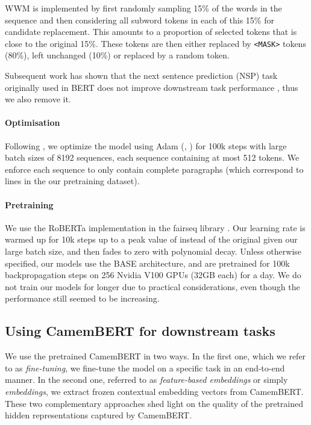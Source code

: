 \documentclass[11pt,a4paper]{article}
\newcommand{\camembert}{CamemBERT\xspace}
\newcommand{\roberta}{RoBERTa\xspace}
\newcommand{\bert}{BERT\xspace}
\begin{document}
WWM is implemented by first randomly sampling 15\% of the words in the sequence and then considering all subword tokens in each of this 15\% for candidate replacement. This amounts to a proportion of selected tokens that is close to the original 15\%.
These tokens are then either replaced by \texttt{<MASK>} tokens (80\%), left unchanged (10\%) or replaced by a random token.

Subsequent work has shown that the next sentence prediction (NSP) task originally used in \bert does not improve downstream task performance \cite{lample2019cross,liu2019roberta}, thus we also remove it.



\paragraph{Optimisation}
Following \citep{liu2019roberta}, we optimize the model using Adam \cite{kingma2014adam} (, ) for 100k steps with large batch sizes of 8192 sequences, each sequence containing at most 512 tokens.
We enforce each sequence to only contain complete paragraphs (which correspond to lines in the our pretraining dataset).

\paragraph{Pretraining}
We use the \roberta implementation in the fairseq library \cite{ott2019fairseq}.
Our learning rate is warmed up for 10k steps up to a peak value of  instead of the original  given our large batch size, and then fades to zero with polynomial decay.
Unless otherwise specified, our models use the BASE architecture, and are pretrained for 100k backpropagation steps on 256 Nvidia V100 GPUs (32GB each) for a day.
We do not train our models for longer due to practical considerations, even though the performance still seemed to be increasing.

\subsection{Using \camembert for downstream tasks}
We use the pretrained \camembert in two ways. In the first one, which we refer to as \textit{fine-tuning}, we fine-tune the model on a specific task in an end-to-end manner. In the second one, referred to as \textit{feature-based embeddings} or simply \textit{embeddings}, we extract frozen contextual embedding vectors from \camembert.
These two complementary approaches shed light on the quality of the pretrained hidden representations captured by \camembert.
\end{document}
